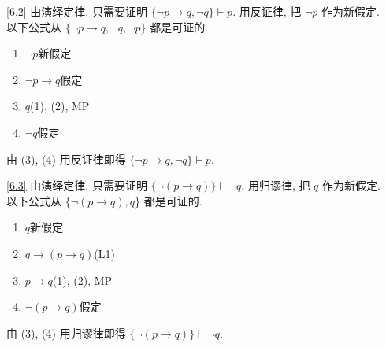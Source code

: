 \documentclass[boxes]{homework}
\begin{document}
\begin{solution}
    \ref{6.2}
    由演绎定律, 只需要证明 $\{\lnot p\to q, \lnot q\}\vdash p$. 用反证律, 把 $\lnot p$ 作为新假定. \\
    以下公式从 $\{\lnot p\to q, \lnot q, \lnot p\}$ 都是可证的.
    \begin{enumerate}[label = (\arabic*)]
        \item $\lnot p$\hfill 新假定
        \item $\lnot p\to q$\hfill 假定
        \item $q$\hfill (1), (2), MP
        \item $\lnot q$\hfill 假定
    \end{enumerate}
    由 (3), (4) 用反证律即得 $\{\lnot p\to q, \lnot q\}\vdash p$.
    
    \ref{6.3}
    由演绎定律, 只需要证明 $\{\lnot(p\to q)\}\vdash \lnot q$. 用归谬律, 把 $q$ 作为新假定.\\
    以下公式从 $\{\lnot(p\to q), q\}$ 都是可证的.
    \begin{enumerate}[label = (\arabic*)]
        \item $q$\hfill 新假定
        \item $q\to (p\to q)$\hfill (L1)
        \item $p\to q$\hfill (1), (2), MP
        \item $\lnot (p\to q)$\hfill 假定
    \end{enumerate}
    由 (3), (4) 用归谬律即得 $\{\lnot(p\to q)\}\vdash \lnot q$.
\end{solution}
\end{document}
